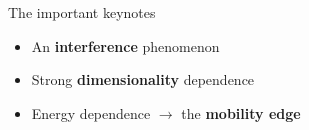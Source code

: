 \documentclass[1pt]{beamer}
\begin{document}
\begin{frame}{The important keynotes}
\begin{minipage}[c]{0.9\textwidth}
\begin{itemize}
\item An \textbf{interference} phenomenon
\vspace{12mm}		
\item Strong \textbf{dimensionality} dependence
\vspace{12mm}
\item Energy dependence $\rightarrow$ the \textbf{mobility edge}

\end{itemize}
\end{minipage}
\end{frame}
\end{document}

